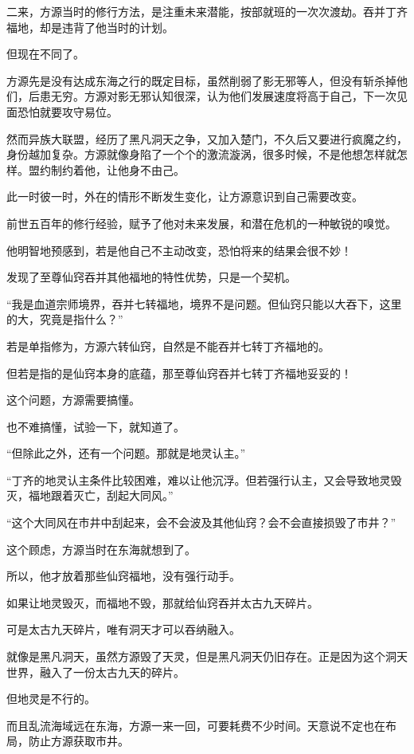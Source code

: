 \begin{this_body}
二来，方源当时的修行方法，是注重未来潜能，按部就班的一次次渡劫。吞并丁齐福地，却是违背了他当时的计划。

但现在不同了。

方源先是没有达成东海之行的既定目标，虽然削弱了影无邪等人，但没有斩杀掉他们，后患无穷。方源对影无邪认知很深，认为他们发展速度将高于自己，下一次见面恐怕就要攻守易位。

然而异族大联盟，经历了黑凡洞天之争，又加入楚门，不久后又要进行疯魔之约，身份越加复杂。方源就像身陷了一个个的激流漩涡，很多时候，不是他想怎样就怎样。盟约制约着他，让他身不由己。

此一时彼一时，外在的情形不断发生变化，让方源意识到自己需要改变。

前世五百年的修行经验，赋予了他对未来发展，和潜在危机的一种敏锐的嗅觉。

他明智地预感到，若是他自己不主动改变，恐怕将来的结果会很不妙！

发现了至尊仙窍吞并其他福地的特性优势，只是一个契机。

“我是血道宗师境界，吞并七转福地，境界不是问题。但仙窍只能以大吞下，这里的大，究竟是指什么？”

若是单指修为，方源六转仙窍，自然是不能吞并七转丁齐福地的。

但若是指的是仙窍本身的底蕴，那至尊仙窍吞并七转丁齐福地妥妥的！

这个问题，方源需要搞懂。

也不难搞懂，试验一下，就知道了。

“但除此之外，还有一个问题。那就是地灵认主。”

“丁齐的地灵认主条件比较困难，难以让他沉浮。但若强行认主，又会导致地灵毁灭，福地跟着灭亡，刮起大同风。”

“这个大同风在市井中刮起来，会不会波及其他仙窍？会不会直接损毁了市井？”

这个顾虑，方源当时在东海就想到了。

所以，他才放着那些仙窍福地，没有强行动手。

如果让地灵毁灭，而福地不毁，那就给仙窍吞并太古九天碎片。

可是太古九天碎片，唯有洞天才可以吞纳融入。

就像是黑凡洞天，虽然方源毁了天灵，但是黑凡洞天仍旧存在。正是因为这个洞天世界，融入了一份太古九天的碎片。

但地灵是不行的。

而且乱流海域远在东海，方源一来一回，可要耗费不少时间。天意说不定也在布局，防止方源获取市井。


\end{this_body}
